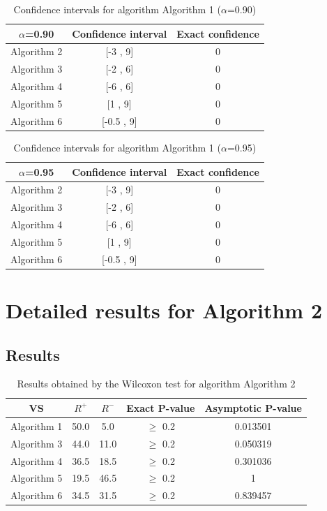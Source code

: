 \documentclass[a4paper,10pt]{article}
\begin{document}
\begin{table}[!htp]
\centering\small
\begin{tabular}{
|c|c|c|}
\hline
 $\alpha$=0.90 & Confidence interval & Exact confidence \\ \hline 
Algorithm 2 & [-3 , 9] & 0\\ \hline 
Algorithm 3 & [-2 , 6] & 0\\ \hline 
Algorithm 4 & [-6 , 6] & 0\\ \hline 
Algorithm 5 & [1 , 9] & 0\\ \hline 
Algorithm 6 & [-0.5 , 9] & 0\\ \hline 

\end{tabular}
\caption{Confidence intervals for algorithm Algorithm 1 ($\alpha$=0.90)}
\end{table}
\begin{table}[!htp]
\centering\small
\begin{tabular}{
|c|c|c|}
\hline
 $\alpha$=0.95 & Confidence interval & Exact confidence \\ \hline 
Algorithm 2 & [-3 , 9] & 0\\ \hline 
Algorithm 3 & [-2 , 6] & 0\\ \hline 
Algorithm 4 & [-6 , 6] & 0\\ \hline 
Algorithm 5 & [1 , 9] & 0\\ \hline 
Algorithm 6 & [-0.5 , 9] & 0\\ \hline 

\end{tabular}
\caption{Confidence intervals for algorithm Algorithm 1 ($\alpha$=0.95)}
\end{table}

 \clearpage 


\section{Detailed results for Algorithm 2}


\subsection{Results}

\begin{table}[!htp]
\centering\small
\begin{tabular}{
|c|c|c|c|c|}
\hline
 VS & $R^{+}$ & $R^{-}$ & Exact P-value & Asymptotic P-value \\ \hline 
Algorithm 1 & 50.0 & 5.0 & $\geq$ 0.2 & 0.013501\\ \hline 
Algorithm 3 & 44.0 & 11.0 & $\geq$ 0.2 & 0.050319\\ \hline 
Algorithm 4 & 36.5 & 18.5 & $\geq$ 0.2 & 0.301036\\ \hline 
Algorithm 5 & 19.5 & 46.5 & $\geq$ 0.2 & 1\\ \hline 
Algorithm 6 & 34.5 & 31.5 & $\geq$ 0.2 & 0.839457\\ \hline 

\end{tabular}
\caption{Results obtained by the Wilcoxon test for algorithm Algorithm 2}
\end{table}
\end{document}
